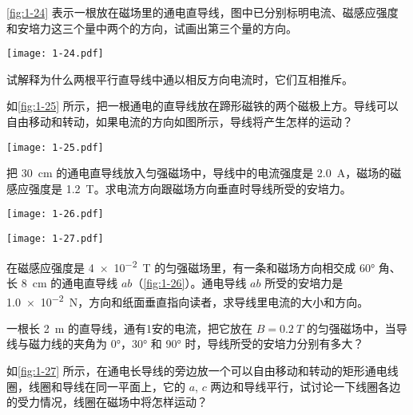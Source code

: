 \begin{Practice}
\begin{question}
  \item \cref{fig:1-24} 表示一根放在磁场里的通电直导线，图中已分别标明电流、磁感应强度和安培力这三个量中两个的方向，试画出第三个量的方向。
  \begin{figurehere}
    \begin{minipage}{\linewidth}\centering
      \texttt{[image: 1-24.pdf]}
      \caption{}\label{fig:1-24}
    \end{minipage}
  \end{figurehere}
  \item 试解释为什么两根平行直导线中通以相反方向电流时，它们互相推斥。
  \item 如\cref{fig:1-25} 所示，把一根通电的直导线放在蹄形磁铁的两个磁极上方。导线可以自由移动和转动，如果电流的方向如图所示，导线将产生怎样的运动？
  \begin{figurehere}
    \begin{minipage}{\linewidth}\centering
      \texttt{[image: 1-25.pdf]}
      \caption{}\label{fig:1-25}
    \end{minipage}
  \end{figurehere}
  \item 把 \qty{30}{cm} 的通电直导线放入匀强磁场中，导线中的电流强度是 \qty{2.0}{A}，磁场的磁感应强度是 \qty{1.2}{T}。求电流方向跟磁场方向垂直时导线所受的安培力。
  \begin{figurehere}
  \begin{minipage}[b]{0.48\linewidth}\centering
    \texttt{[image: 1-26.pdf]}
    \caption{}\label{fig:1-26}
  \end{minipage}
  \begin{minipage}[b]{0.48\linewidth}\centering
    \texttt{[image: 1-27.pdf]}
    \caption{}\label{fig:1-27}
  \end{minipage}
  \end{figurehere}
  \item 在磁感应强度是 \qty{4e-2}{T} 的匀强磁场里，有一条和磁场方向相交成 \ang{60} 角、长 \qty{8}{cm} 的通电直导线 $ab$（\cref{fig:1-26}）。通电导线 $ab$ 所受的安培力是 \qty{1.0e-2}{N}，方向和纸面垂直指向读者，求导线里电流的大小和方向。
  \item 一根长 \qty{2}{m} 的直导线，通有1安的电流，把它放在 $B=\qty{0.2}{T}$ 的匀强磁场中，当导线与磁力线的夹角为 \ang{0}，\ang{30} 和 \ang{90} 时，导线所受的安培力分别有多大？
  \item 如\cref{fig:1-27} 所示，在通电长导线的旁边放一个可以自由移动和转动的矩形通电线圈，线圈和导线在同一平面上，它的 $a$, $c$ 两边和导线平行，试讨论一下线圈各边的受力情况，线圈在磁场中将怎样运动？
\end{question}
\end{Practice}

